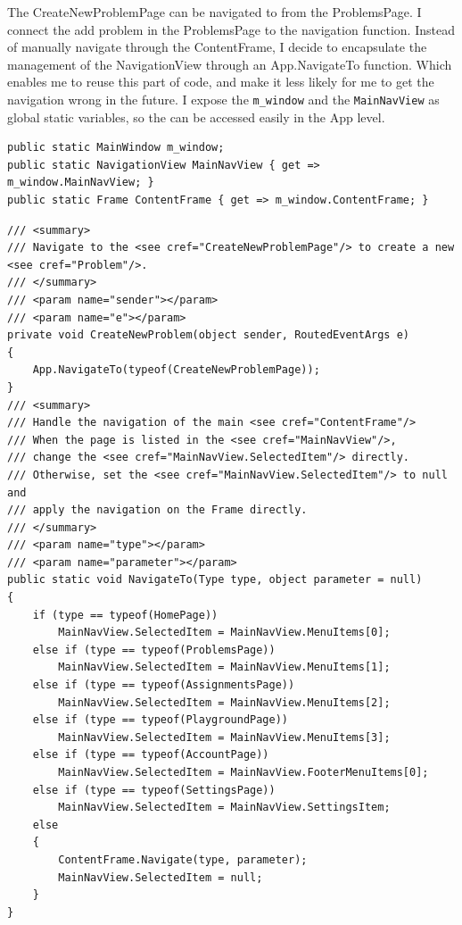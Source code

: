 \documentclass[a4paper]{report}
\begin{document}
The CreateNewProblemPage can be navigated to from the ProblemsPage. I connect the add problem in the ProblemsPage to the navigation function. Instead of manually navigate through the ContentFrame, I decide to encapsulate the management of the NavigationView through an App.NavigateTo function. Which enables me to reuse this part of code, and make it less likely for me to get the navigation wrong in the future. I expose the \verb|m_window| and the \verb|MainNavView| as global static variables, so the can be accessed easily in the App level.

\begin{verbatim}
public static MainWindow m_window;
public static NavigationView MainNavView { get => m_window.MainNavView; }
public static Frame ContentFrame { get => m_window.ContentFrame; }

\end{verbatim}

\begin{verbatim}
/// <summary>
/// Navigate to the <see cref="CreateNewProblemPage"/> to create a new <see cref="Problem"/>.
/// </summary>
/// <param name="sender"></param>
/// <param name="e"></param>
private void CreateNewProblem(object sender, RoutedEventArgs e)
{
    App.NavigateTo(typeof(CreateNewProblemPage));
}
/// <summary>
/// Handle the navigation of the main <see cref="ContentFrame"/>
/// When the page is listed in the <see cref="MainNavView"/>, 
/// change the <see cref="MainNavView.SelectedItem"/> directly.
/// Otherwise, set the <see cref="MainNavView.SelectedItem"/> to null and 
/// apply the navigation on the Frame directly.
/// </summary>
/// <param name="type"></param>
/// <param name="parameter"></param>
public static void NavigateTo(Type type, object parameter = null)
{
    if (type == typeof(HomePage))
        MainNavView.SelectedItem = MainNavView.MenuItems[0];
    else if (type == typeof(ProblemsPage))
        MainNavView.SelectedItem = MainNavView.MenuItems[1];
    else if (type == typeof(AssignmentsPage))
        MainNavView.SelectedItem = MainNavView.MenuItems[2];
    else if (type == typeof(PlaygroundPage))
        MainNavView.SelectedItem = MainNavView.MenuItems[3];
    else if (type == typeof(AccountPage))
        MainNavView.SelectedItem = MainNavView.FooterMenuItems[0];
    else if (type == typeof(SettingsPage))
        MainNavView.SelectedItem = MainNavView.SettingsItem;
    else
    {
        ContentFrame.Navigate(type, parameter);
        MainNavView.SelectedItem = null;
    }
}
\end{verbatim}
\end{document}

